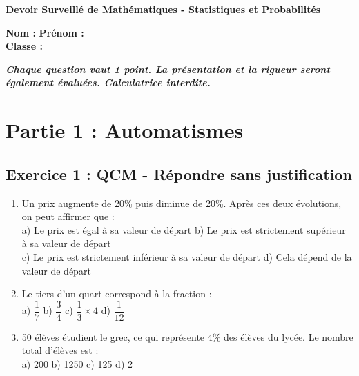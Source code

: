 \documentclass[12pt,a4paper]{article}
\begin{document}
\centering\textbf{Devoir Surveill\'e de Math\'ematiques - Statistiques et Probabilit\'es}\\
\vspace{0.5cm}

\noindent\textbf{Nom :} \underline{\hspace{5cm}} \hfill \textbf{Pr\'enom :} \underline{\hspace{5cm}} \\
\textbf{Classe :} \underline{\hspace{5cm}}\\
\vspace{1cm}

\centering\textit{\textbf{Chaque question vaut 1 point. La pr\'esentation et la rigueur seront \'egalement \'evalu\'ees. Calculatrice interdite.}}

\section*{Partie 1 : Automatismes}

\subsection*{Exercice 1 : QCM - Répondre sans justification}

\begin{enumerate}
    \item Un prix augmente de 20\% puis diminue de 20\%. Après ces deux évolutions, on peut affirmer que :\\
    a) Le prix est égal à sa valeur de départ \quad
    b) Le prix est strictement supérieur à sa valeur de départ \\
    c) Le prix est strictement inférieur à sa valeur de départ \quad
    d) Cela dépend de la valeur de départ

    \item Le tiers d’un quart correspond à la fraction : \\
    a) $\dfrac{1}{7}$ \quad b) $\dfrac{3}{4}$ \quad c) $\dfrac{1}{3} \times 4$ \quad d) $\dfrac{1}{12}$

    \item 50 élèves étudient le grec, ce qui représente 4\% des élèves du lycée. Le nombre total d'élèves est : \\
    a) 200 \quad b) 1250 \quad c) 125 \quad d) 2
\end{enumerate}

\vspace{0.5cm}
\begin{tcolorbox}[colframe=black, colback=white, width=\linewidth]
\vspace{6cm}
\end{tcolorbox}
\end{document}
